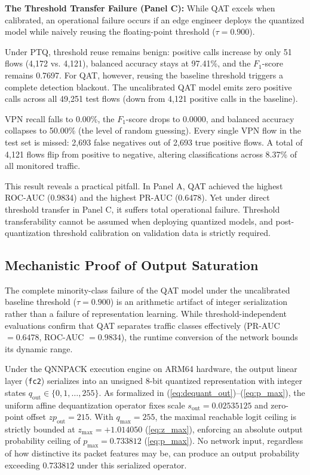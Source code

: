 \documentclass[conference]{IEEEtran}
\begin{document}
\textbf{The Threshold Transfer Failure (Panel C):} While QAT excels when calibrated, an operational failure occurs if an edge engineer deploys the quantized model while naively reusing the floating-point threshold ($\tau = 0.900$). 

Under PTQ, threshold reuse remains benign: positive calls increase by only 51 flows (4,172 vs. 4,121), balanced accuracy stays at 97.41\%, and the $F_1$-score remains 0.7697. For QAT, however, reusing the baseline threshold triggers a complete detection blackout. The uncalibrated QAT model emits zero positive calls across all 49,251 test flows (down from 4,121 positive calls in the baseline).

VPN recall falls to 0.00\%, the $F_1$-score drops to 0.0000, and balanced accuracy collapses to 50.00\% (the level of random guessing). Every single VPN flow in the test set is missed: 2,693 false negatives out of 2,693 true positive flows. A total of 4,121 flows flip from positive to negative, altering classifications across 8.37\% of all monitored traffic.

This result reveals a practical pitfall. In Panel A, QAT achieved the highest ROC-AUC (0.9834) and the highest PR-AUC (0.6478). Yet under direct threshold transfer in Panel C, it suffers total operational failure. Threshold transferability cannot be assumed when deploying quantized models, and post-quantization threshold calibration on validation data is strictly required.

\subsection{Mechanistic Proof of Output Saturation}

The complete minority-class failure of the QAT model under the uncalibrated baseline threshold ($\tau = 0.900$) is an arithmetic artifact of integer serialization rather than a failure of representation learning. While threshold-independent evaluations confirm that QAT separates traffic classes effectively (PR-AUC $= 0.6478$, ROC-AUC $= 0.9834$), the runtime conversion of the network bounds its dynamic range.

Under the QNNPACK execution engine on ARM64 hardware, the output linear layer (\texttt{fc2}) serializes into an unsigned 8-bit quantized representation with integer states $q_{\text{out}} \in \{0, 1, \dots, 255\}$. As formalized in (\ref{eq:dequant_out})--(\ref{eq:p_max}), the uniform affine dequantization operator fixes scale $s_{\text{out}} = 0.02535125$ and zero-point offset $zp_{\text{out}} = 215$. With $q_{\max} = 255$, the maximal reachable logit ceiling is strictly bounded at $z_{\max} = +1.014050$ (\ref{eq:z_max}), enforcing an absolute output probability ceiling of $p_{\max} = 0.733812$ (\ref{eq:p_max}). No network input, regardless of how distinctive its packet features may be, can produce an output probability exceeding $0.733812$ under this serialized operator.
\end{document}
